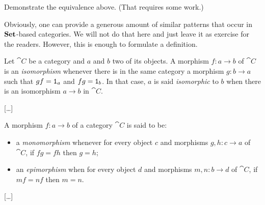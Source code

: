 \begin{exercise}
Demonstrate the equivalence above. (That requires some work.)
\end{exercise}

Obviously, one can provide a generous amount of similar patterns that occur in \(\mathbf{Set}\)-based categories. We will not do that here and just leave it as exercise for the readers. However, this is enough to formulate a definition.

\begin{definition}
Let \(\cat C\) be a category and \(a\) and \(b\) two of its objects. A morphism \(f : a \to b\) of \(\cat C\) is an {\em isomorphism} whenever there is in the same category a morphism \(g : b \to a\) such that \(gf = \mathtt 1_a\) and \(fg = \mathtt 1_b\).
In that case, \(a\) is said {\em isomorphic} to \(b\) when there is an isomorphism \(a \to b\) in \(\cat C\).
\end{definition}

[\dots{}]

\begin{definition}
A morphism \(f : a \to b\) of a category \(\cat C\) is said to be:
\begin{itemize}
\item a {\em monomorphism} whenever for every object \(c\) and morphisms \(g, h : c \to a\) of \(\cat C\), if \(fg = fh\) then \(g = h\);
\item an {\em epimorphism} when for every object \(d\) and morphisms \(m, n : b \to d\) of \(\cat C\), if \(mf = nf\) then \(m = n\).
\end{itemize}
\end{definition}

[\dots{}]

